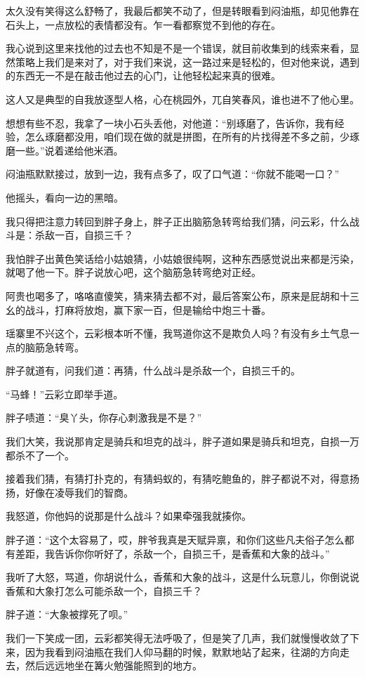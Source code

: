 太久没有笑得这么舒畅了，我最后都笑不动了，但是转眼看到闷油瓶，却见他靠在石头上，一点放松的表情都没有。乍一看都察觉不到他的存在。

我心说到这里来找他的过去也不知是不是一个错误，就目前收集到的线索来看，显然策略上我们是来对了，对于我们来说，这一路过来是轻松的，但对他来说，遇到的东西无一不是在敲击他过去的心门，让他轻松起来真的很难。

这人又是典型的自我放逐型人格，心在桃园外，兀自笑春风，谁也进不了他心里。

想想有些不忍，我拿了一块小石头丢他，对他道：“别琢磨了，告诉你，我有经验，怎么琢磨都没用，咱们现在做的就是拼图，在所有的片找得差不多之前，少琢磨一些。”说着递给他米酒。

闷油瓶默默接过，放到一边，我有点多了，叹了口气道：“你就不能喝一口？”

他摇头，看向一边的黑暗。

我只得把注意力转回到胖子身上，胖子正出脑筋急转弯给我们猜，问云彩，什么战斗是：杀敌一百，自损三千？

我怕胖子出黄色笑话给小姑娘猜，小姑娘很纯啊，这种东西感觉说出来都是污染，就喝了他一下。胖子说放心吧，这个脑筋急转弯绝对正经。

阿贵也喝多了，咯咯直傻笑，猜来猜去都不对，最后答案公布，原来是屁胡和十三幺的战斗，打麻将放炮，赢下家一百，但是输给中炮三十番。

瑶寨里不兴这个，云彩根本听不懂，我骂道你这不是欺负人吗？有没有乡土气息一点的脑筋急转弯。

胖子就道有，问我们道：再猜，什么战斗是杀敌一个，自损三千的。

“马蜂！”云彩立即举手道。

胖子啧道：“臭丫头，你存心刺激我是不是？”

我们大笑，我说那肯定是骑兵和坦克的战斗，胖子道如果是骑兵和坦克，自损一万都杀不了一个。

接着我们猜，有猜打扑克的，有猜蚂蚁的，有猜吃鲍鱼的，胖子都说不对，得意扬扬，好像在凌辱我们的智商。

我怒道，你他妈的说那是什么战斗？如果牵强我就揍你。

胖子道：“这个太容易了，哎，胖爷我真是天赋异禀，和你们这些凡夫俗子怎么都有差距，我告诉你你听好了，杀敌一个，自损三千，是香蕉和大象的战斗。”

我听了大怒，骂道，你胡说什么，香蕉和大象的战斗，这是什么玩意儿，你倒说说香蕉和大象打怎么可能杀敌一个，自损三千？

胖子道：“大象被撑死了呗。”

我们一下笑成一团，云彩都笑得无法呼吸了，但是笑了几声，我们就慢慢收敛了下来，因为我看到闷油瓶在我们人仰马翻的时候，默默地站了起来，往湖的方向走去，然后远远地坐在篝火勉强能照到的地方。

